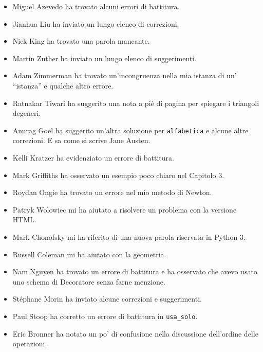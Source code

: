 \documentclass[10pt]{book}
\begin{document}
\begin{itemize}
\item Miguel Azevedo ha trovato alcuni errori di battitura.

\item Jianhua Liu ha inviato un lungo elenco di correzioni.

\item Nick King ha trovato una parola mancante.

\item Martin Zuther ha inviato un lungo elenco di suggerimenti.

\item Adam Zimmerman ha trovato un'incongruenza nella mia istanza di un' ``istanza'' e qualche altro errore.

\item Ratnakar Tiwari ha suggerito una nota a pié di pagina per spiegare i triangoli degeneri.

\item Anurag Goel ha suggerito un'altra soluzione per \verb"alfabetica"
e alcune altre correzioni. E sa come si scrive Jane Austen.

\item Kelli Kratzer ha evidenziato un errore di battitura.

\item Mark Griffiths ha osservato un esempio poco chiaro nel Capitolo 3.

\item Roydan Ongie ha trovato un errore nel mio metodo di Newton.

\item Patryk Wolowiec mi ha aiutato a risolvere un problema con la versione HTML.

\item Mark Chonofsky mi ha riferito di una nuova parola riservata in Python 3.

\item Russell Coleman mi ha aiutato con la geometria.

\item Nam Nguyen ha trovato un errore di battitura e ha osservato che avevo usato uno schema di Decoratore senza farne menzione.

\item St\'{e}phane Morin ha inviato alcune correzioni e suggerimenti.

\item Paul Stoop ha corretto un errore di battitura in \verb+usa_solo+.

\item Eric Bronner ha notato un po' di confusione nella discussione dell'ordine delle operazioni.


\end{itemize}
\end{document}
